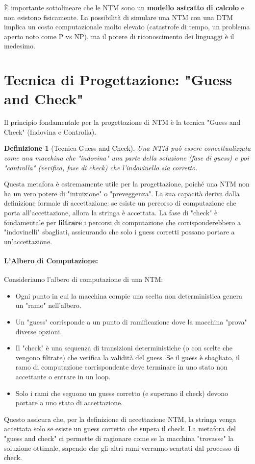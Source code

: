 \documentclass[a4paper]{article}
\newtheorem{definition}{Definizione}[section]
\begin{document}
È importante sottolineare che le NTM sono un \textbf{modello astratto di calcolo} e non esistono fisicamente. La possibilità di simulare una NTM con una DTM implica un costo computazionale molto elevato (catastrofe di tempo, un problema aperto noto come P vs NP), ma il potere di riconoscimento dei linguaggi è il medesimo.

\section{Tecnica di Progettazione: "Guess and Check"}

Il principio fondamentale per la progettazione di NTM è la tecnica "Guess and Check" (Indovina e Controlla).

\begin{definition}[Tecnica Guess and Check]
Una NTM può essere concettualizzata come una macchina che "indovina" una parte della soluzione (fase di \emph{guess}) e poi "controlla" (verifica, fase di \emph{check}) che l'indovinello sia corretto.
\end{definition}

Questa metafora è estremamente utile per la progettazione, poiché una NTM non ha un vero potere di "intuizione" o "preveggenza". La sua capacità deriva dalla definizione formale di accettazione: se esiste un percorso di computazione che porta all'accettazione, allora la stringa è accettata. La fase di "check" è fondamentale per \textbf{filtrare} i percorsi di computazione che corrisponderebbero a "indovinelli" sbagliati, assicurando che solo i guess corretti possano portare a un'accettazione.

\paragraph{L'Albero di Computazione:}
Consideriamo l'albero di computazione di una NTM:
\begin{itemize}
    \item Ogni punto in cui la macchina compie una scelta non deterministica genera un "ramo" nell'albero.
    \item Un "guess" corrisponde a un punto di ramificazione dove la macchina "prova" diverse opzioni.
    \item Il "check" è una sequenza di transizioni deterministiche (o con scelte che vengono filtrate) che verifica la validità del guess. Se il guess è sbagliato, il ramo di computazione corrispondente deve terminare in uno stato non accettante o entrare in un loop.
    \item Solo i rami che seguono un guess corretto (e superano il check) devono portare a uno stato di accettazione.
\end{itemize}
Questo assicura che, per la definizione di accettazione NTM, la stringa venga accettata solo se esiste un guess corretto che supera il check. La metafora del "guess and check" ci permette di ragionare come se la macchina "trovasse" la soluzione ottimale, sapendo che gli altri rami verranno scartati dal processo di check.
\end{document}
